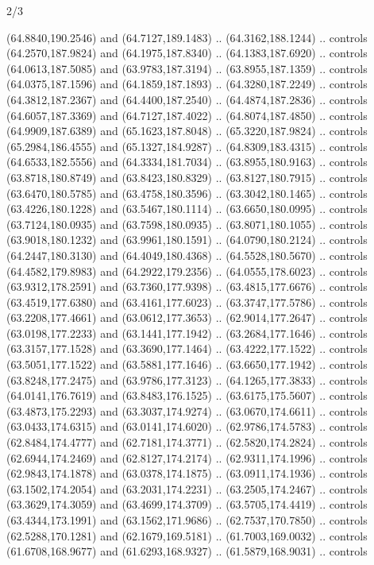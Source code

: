 \begin{flagdescription}{2/3}
\begin{scope}[shift={(0.5\flaglength,0.5)},scale=\flagwidth/320]
\begin{scope}[y=0.8pt, x=0.8pt, yscale=-1,shift={(-118.3,-146)}]
  (64.8840,190.2546) and (64.7127,189.1483) .. (64.3162,188.1244) .. controls
  (64.2570,187.9824) and (64.1975,187.8340) .. (64.1383,187.6920) .. controls
  (64.0613,187.5085) and (63.9783,187.3194) .. (63.8955,187.1359) .. controls
  (64.0375,187.1596) and (64.1859,187.1893) .. (64.3280,187.2249) .. controls
  (64.3812,187.2367) and (64.4400,187.2540) .. (64.4874,187.2836) .. controls
  (64.6057,187.3369) and (64.7127,187.4022) .. (64.8074,187.4850) .. controls
  (64.9909,187.6389) and (65.1623,187.8048) .. (65.3220,187.9824) .. controls
  (65.2984,186.4555) and (65.1327,184.9287) .. (64.8309,183.4315) .. controls
  (64.6533,182.5556) and (64.3334,181.7034) .. (63.8955,180.9163) .. controls
  (63.8718,180.8749) and (63.8423,180.8329) .. (63.8127,180.7915) .. controls
  (63.6470,180.5785) and (63.4758,180.3596) .. (63.3042,180.1465) .. controls
  (63.4226,180.1228) and (63.5467,180.1114) .. (63.6650,180.0995) .. controls
  (63.7124,180.0935) and (63.7598,180.0935) .. (63.8071,180.1055) .. controls
  (63.9018,180.1232) and (63.9961,180.1591) .. (64.0790,180.2124) .. controls
  (64.2447,180.3130) and (64.4049,180.4368) .. (64.5528,180.5670) .. controls
  (64.4582,179.8983) and (64.2922,179.2356) .. (64.0555,178.6023) .. controls
  (63.9312,178.2591) and (63.7360,177.9398) .. (63.4815,177.6676) .. controls
  (63.4519,177.6380) and (63.4161,177.6023) .. (63.3747,177.5786) .. controls
  (63.2208,177.4661) and (63.0612,177.3653) .. (62.9014,177.2647) .. controls
  (63.0198,177.2233) and (63.1441,177.1942) .. (63.2684,177.1646) .. controls
  (63.3157,177.1528) and (63.3690,177.1464) .. (63.4222,177.1522) .. controls
  (63.5051,177.1522) and (63.5881,177.1646) .. (63.6650,177.1942) .. controls
  (63.8248,177.2475) and (63.9786,177.3123) .. (64.1265,177.3833) .. controls
  (64.0141,176.7619) and (63.8483,176.1525) .. (63.6175,175.5607) .. controls
  (63.4873,175.2293) and (63.3037,174.9274) .. (63.0670,174.6611) .. controls
  (63.0433,174.6315) and (63.0141,174.6020) .. (62.9786,174.5783) .. controls
  (62.8484,174.4777) and (62.7181,174.3771) .. (62.5820,174.2824) .. controls
  (62.6944,174.2469) and (62.8127,174.2174) .. (62.9311,174.1996) .. controls
  (62.9843,174.1878) and (63.0378,174.1875) .. (63.0911,174.1936) .. controls
  (63.1502,174.2054) and (63.2031,174.2231) .. (63.2505,174.2467) .. controls
  (63.3629,174.3059) and (63.4699,174.3709) .. (63.5705,174.4419) .. controls
  (63.4344,173.1991) and (63.1562,171.9686) .. (62.7537,170.7850) .. controls
  (62.5288,170.1281) and (62.1679,169.5181) .. (61.7003,169.0032) .. controls
  (61.6708,168.9677) and (61.6293,168.9327) .. (61.5879,168.9031) .. controls

\end{scope}
\end{scope}
\end{flagdescription}
